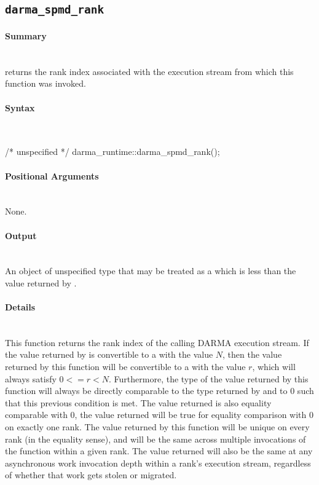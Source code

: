


\subsection{\texttt{darma\_spmd\_rank}}

\paragraph{Summary}\mbox{}\\
 returns the \gls{rank} index associated with the
\gls{execution stream} from which this function was invoked.

\paragraph{Syntax}\mbox{}\\
\begin{CppCode}
/* unspecified */ darma_runtime::darma_spmd_rank();
\end{CppCode}

\paragraph{Positional Arguments} \mbox{}\\
None. 

\paragraph{Output}\mbox{}\\
An object of unspecified type that may be treated as a 
which is less than the value returned by .

\paragraph{Details}\mbox{}\\
This function returns the \gls{rank} index of the calling \gls{DARMA} \gls{execution
stream}.  If the value returned
by  is convertible to a  with the
value $N$, then the value returned by this function will be convertible to a
 with the value $r$, which will always satisfy $0 <=
r < N$.  Furthermore, the type of the value returned by this function will
always be directly comparable to the type returned by 
and to $0$ such that this previous condition is met.  The value returned is also
equality comparable with $0$, the value returned will be true for equality
comparison with $0$ on exactly one rank.  The value returned by this function
will be unique on every \gls{rank} (in the equality sense), and will be the same
across multiple invocations of the function within a given \gls{rank}.  The value
returned will also be the same at any asynchronous work invocation depth within
a \gls{rank}'s \gls{execution stream}, regardless of whether that work gets stolen or
migrated.

